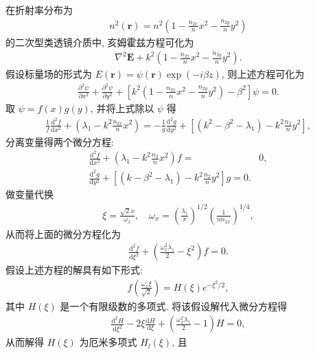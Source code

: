 \documentclass[twoside]{note}
\begin{document}
\begin{pf}
    在折射率分布为
    \begin{align}
        n^2(\bm{r})=n^2\left(1-\frac{n_{2x}}{n}x^2-\frac{n_{2y}}{n}y^2\right)
    \end{align}
    的二次型类透镜介质中, 亥姆霍兹方程可化为
    \begin{align}
        \nabla^2\bm{E}+k^2\left(1-\frac{n_{2x}}{n}x^2-\frac{n_{2y}}{n}y^2\right).
    \end{align}
    假设标量场的形式为 $E(\bm{r})=\psi(\bm{r})\exp(-i\beta z)$, 则上述方程可化为
    \begin{align}
        \frac{\partial^2\psi}{\partial x^2}+\frac{\partial^2\psi}{\partial y^2}+\left[k^2\left(1-\frac{n_{2x}}{n}x^2-\frac{n_{2y}}{n}y^2\right)-\beta^2\right]\psi=0.
    \end{align}
    取 $\psi=f(x)g(y)$, 并将上式除以 $\psi$ 得
    \begin{align}
        \frac{1}{f}\frac{\mathrm{d}^2f}{\mathrm{d}x^2}+\left(\lambda_1-k^2\frac{n_{2x}}{n}x^2\right)=-\frac{1}{g}\frac{\mathrm{d}^2g}{\mathrm{d}y^2}+\left[(k^2-\beta^2-\lambda_1)-k^2\frac{n_2}{n}y^2\right],
    \end{align}
    分离变量得两个微分方程:
    \begin{align}
        \frac{\mathrm{d}^2f}{\mathrm{d}x^2}+\left(\lambda_1-k^2\frac{n_2}{n}x^2\right)f=&0,\\
        \frac{\mathrm{d}^2g}{\mathrm{d}y^2}+\left[(k-\beta^2-\lambda_1)-k^2\frac{n_2}{n}y^2\right]g=0.
    \end{align}
    做变量代换
    \begin{align}
        \xi=\frac{\sqrt{2}x}{\omega_x},\quad\omega_x=\left(\frac{\lambda_1}{\pi}\right)^{1/2}\left(\frac{1}{nn_{2x}}\right)^{1/4},
    \end{align}
    从而将上面的微分方程化为
    \begin{align}
        \frac{\mathrm{d}^2f}{\mathrm{d}\xi^2}+\left(\frac{\omega_x^2\lambda_1}{2}-\xi^2\right)f=0.
    \end{align}
    假设上述方程的解具有如下形式:
    \begin{align}
        f\left(\frac{\omega_x\xi}{\sqrt{2}}\right)=H(\xi)e^{-\xi^2/2},
    \end{align}
    其中 $H(\xi)$ 是一个有限级数的多项式. 将该假设解代入微分方程得
    \begin{align}
        \frac{\mathrm{d}^2H}{\mathrm{d}\xi^2}-2\xi\frac{\mathrm{d}H}{\mathrm{d}\xi}+\left(\frac{\omega_x^2\lambda_1}{2}-1\right)H=0,
    \end{align}
    从而解得 $H(\xi)$ 为厄米多项式 $H_l(\xi)$, 且

\end{pf}
\end{document}
